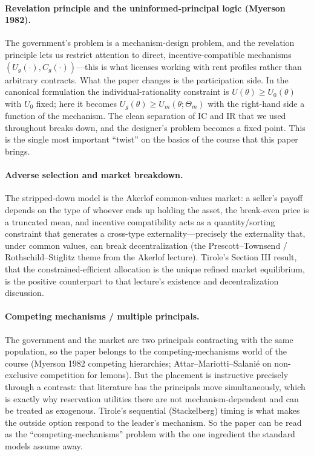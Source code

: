 \documentclass[11pt]{article}
\theoremstyle{definition}
\theoremstyle{plain}
\newcommand{\Ug}{U_g}
\newcommand{\Um}{U_m}
\begin{document}
\paragraph{Revelation principle and the uninformed-principal logic (Myerson 1982).}
The government's problem is a mechanism-design problem, and the revelation
principle lets us restrict attention to direct, incentive-compatible mechanisms
$(\Ug(\cdot),C_g(\cdot))$---this is what licenses working with rent profiles
rather than arbitrary contracts. What the paper changes is the
participation side. In the canonical formulation the individual-rationality
constraint is $U(\theta)\ge U_0(\theta)$ with $U_0$ fixed; here it becomes
$\Ug(\theta)\ge \Um(\theta;\Theta_m)$ with the right-hand side a
function of the mechanism. The clean separation of IC and IR that we used
throughout breaks down, and the designer's problem becomes a fixed point. This is
the single most important ``twist'' on the basics of the course that this paper brings.

\paragraph{Adverse selection and market breakdown.} The
stripped-down model is the Akerlof common-values market: a seller's payoff
depends on the type of whoever ends up holding the asset, the break-even price is
a truncated mean, and incentive compatibility acts as a quantity/sorting
constraint that generates a cross-type externality---precisely the externality
that, under common values, can break decentralization (the Prescott--Townsend /
Rothschild--Stiglitz theme from the Akerlof lecture). Tirole's Section III result,
that the constrained-efficient allocation is the unique refined market
equilibrium, is the positive counterpart to that lecture's existence and
decentralization discussion.

\paragraph{Competing mechanisms / multiple principals.} The government and the
market are two principals contracting with the same population, so the paper
belongs to the competing-mechanisms world of the course (Myerson 1982 competing
hierarchies; Attar--Mariotti--Salani\'e  on non-exclusive competition for lemons).
But the placement is instructive precisely through a contrast: that
literature has the principals move simultaneously, which is exactly why
reservation utilities there are not mechanism-dependent and can be treated
as exogenous. Tirole's sequential (Stackelberg) timing is what makes the
outside option respond to the leader's mechanism. So the paper can be read as the
``competing-mechanisms'' problem with the one ingredient the standard models
assume away.
\end{document}
